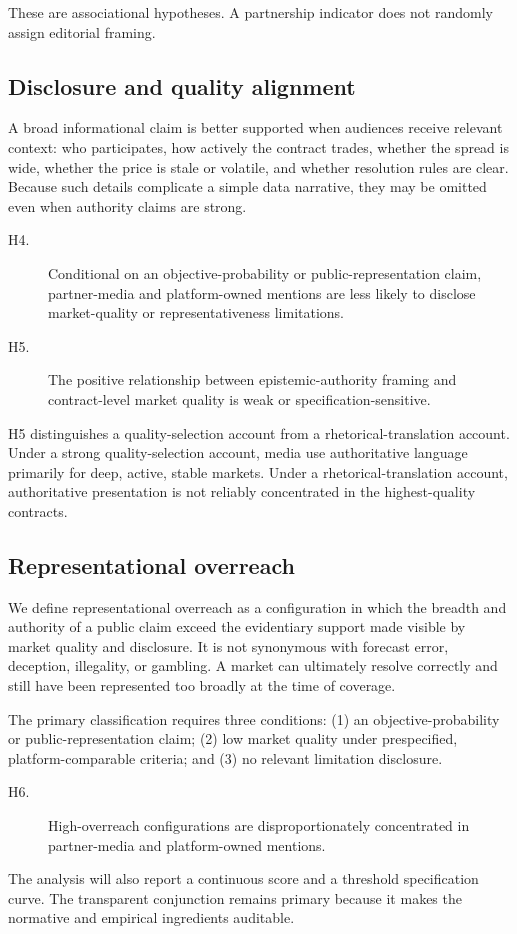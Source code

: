 These are associational hypotheses. A partnership indicator does not randomly assign editorial framing.

\subsection{Disclosure and quality alignment}

A broad informational claim is better supported when audiences receive relevant context: who participates, how actively the contract trades, whether the spread is wide, whether the price is stale or volatile, and whether resolution rules are clear. Because such details complicate a simple data narrative, they may be omitted even when authority claims are strong.

\begin{description}
\item[H4.] Conditional on an objective-probability or public-representation claim, partner-media and platform-owned mentions are less likely to disclose market-quality or representativeness limitations.
\item[H5.] The positive relationship between epistemic-authority framing and contract-level market quality is weak or specification-sensitive.
\end{description}

H5 distinguishes a quality-selection account from a rhetorical-translation account. Under a strong quality-selection account, media use authoritative language primarily for deep, active, stable markets. Under a rhetorical-translation account, authoritative presentation is not reliably concentrated in the highest-quality contracts.

\subsection{Representational overreach}

We define representational overreach as a configuration in which the breadth and authority of a public claim exceed the evidentiary support made visible by market quality and disclosure. It is not synonymous with forecast error, deception, illegality, or gambling. A market can ultimately resolve correctly and still have been represented too broadly at the time of coverage.

The primary classification requires three conditions: (1) an objective-probability or public-representation claim; (2) low market quality under prespecified, platform-comparable criteria; and (3) no relevant limitation disclosure.

\begin{description}
\item[H6.] High-overreach configurations are disproportionately concentrated in partner-media and platform-owned mentions.
\end{description}

The analysis will also report a continuous score and a threshold specification curve. The transparent conjunction remains primary because it makes the normative and empirical ingredients auditable.
